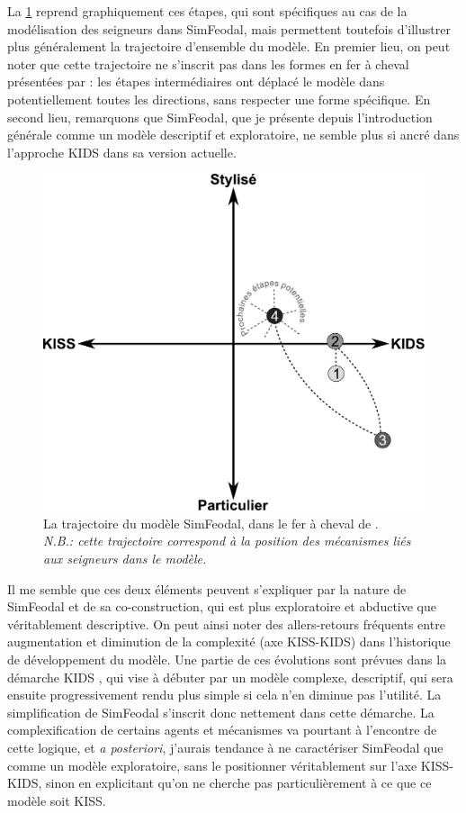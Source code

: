 La \cref{fig:trajectoire-simfeodal} reprend graphiquement ces étapes, qui sont spécifiques au cas de la modélisation des seigneurs dans SimFeodal, mais permettent toutefois d'illustrer plus généralement la trajectoire d'ensemble du modèle.
En premier lieu, on peut noter que cette trajectoire ne s'inscrit pas dans les formes \og en fer à cheval\fg{} présentées par \textcite{banos2013modeliser} : les étapes intermédiaires ont \og déplacé\fg{} le modèle dans potentiellement toutes les directions, sans respecter une forme spécifique.
En second lieu, remarquons que SimFeodal, que je présente depuis l'introduction générale comme un modèle descriptif et exploratoire, ne semble plus si ancré dans l'approche KIDS dans sa version actuelle.

\begin{figure}[H]
	\centering
	\includegraphics[width=.8\linewidth]{img/trajectoire_simfeodal.pdf}
	\caption[La trajectoire du modèle SimFeodal, dans le \og fer à cheval\fg{} de \textcite{banos2013modeliser}.]{La trajectoire du modèle SimFeodal, dans le \og fer à cheval\fg{} de \textcite{banos2013modeliser}.\\
	\textit{N.B.: cette trajectoire correspond à la position des mécanismes liés aux seigneurs dans le modèle.}}
	\label{fig:trajectoire-simfeodal}
\end{figure}

Il me semble que ces deux éléments peuvent s'expliquer par la nature de SimFeodal et de sa co-construction, qui est plus exploratoire et abductive que véritablement descriptive.
On peut ainsi noter des allers-retours fréquents entre augmentation et diminution de la complexité (axe KISS-KIDS) dans l'historique de développement du modèle.
Une partie de ces évolutions sont prévues dans la démarche KIDS \autocite{edmonds_kiss_2005}, qui vise à débuter par un modèle \og complexe\fg{}, descriptif, qui sera ensuite progressivement rendu plus simple si cela n'en diminue pas l'utilité.
La \og simplification\fg{} de SimFeodal s'inscrit donc nettement dans cette démarche.
La complexification de certains agents et mécanismes va pourtant à l'encontre de cette logique, et \textit{a posteriori}, j'aurais tendance à ne caractériser SimFeodal que comme un modèle exploratoire, sans le positionner véritablement sur l'axe KISS-KIDS, sinon en explicitant qu'on ne cherche pas particulièrement à ce que ce modèle soit KISS.

